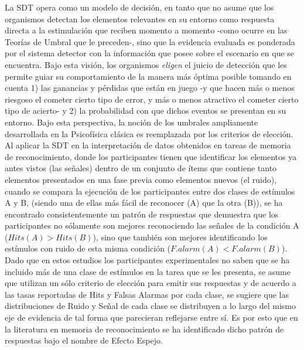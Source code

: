 La SDT opera como un modelo de decisión, en tanto que no asume que los organismos detectan los elementos relevantes en su entorno como respuesta directa a la estimulación que reciben momento a momento -como ocurre en las Teorías de Umbral que le preceden-, sino que la evidencia evaluada es ponderada por el sistema detector con la información que posee sobre el escenario en que se encuentra. Bajo esta visión, los organismos \textit{eligen} el juicio de detección que les permite guiar su comportamiento de la manera más óptima posible tomando en cuenta 1) las ganancias y pérdidas que están en juego -y que hacen más o menos riesgoso el cometer cierto tipo de error, y más o menos atractivo el cometer cierto tipo de acierto- y 2) la probabilidad con que dichos eventos se presentan en su entorno. Bajo esta perspectiva, la noción de los umbrales ampliamente desarrollada en la Psicofísica clásica es reemplazada por los criterios de elección.\\ 

Al aplicar la SDT en la interpretación de datos obtenidos en tareas de memoria de reconocimiento, donde los participantes tienen que identificar los elementos ya antes vistos (las señales) dentro de un conjunto de ítems que contiene tanto elementos presentados en una fase previa como elementos nuevos (el ruido), cuando se compara la ejecución de los participantes entre dos clases de estímulos A y B, (siendo una de ellas más fácil de reconocer (A) que la otra (B)), se ha encontrado consistentemente un patrón de respuestas que demuestra que los participantes no sólamente son mejores reconociendo las señales de la condición A ($Hits(A)>Hits(B)$), sino que también son mejores identificando los estímulos con ruido de esta misma condición ($F.alarm(A)<F.alarm(B)$). Dado que en estos estudios los participantes experimentales no saben que se ha incluido más de una clase de estímulos en la tarea que se les presenta, se asume que utilizan un sólo criterio de elección para emitir sus respuestas y de acuerdo a las tasas reportadas de Hits y Falsas Alarmas por cada clase, se sugiere que las distribuciones de Ruido y Señal de cada clase se distribuyen a lo largo del mismo eje de evidencia de tal forma que parecieran reflejarse entre sí. Es por esto que en la literatura en memoria de reconocimiento se ha identificado dicho patrón de respuestas bajo el nombre de Efecto Espejo.\\

